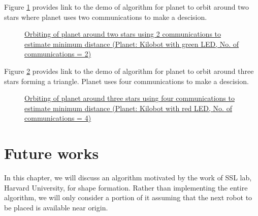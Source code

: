 \documentclass{report}[12pt]
\begin{document}
Figure \ref{fig:orbit_two_star} provides link to the demo of algorithm for planet to orbit around two stars where planet uses two communications to make a descision.
\begin{figure}[H]
    \centering
    \caption{\href{https://youtu.be/EKvty2OxXxM}{Orbiting of planet around two stars using 2 communications to estimate minimum distance (Planet: Kilobot with green LED, No. of communications = 2)}}
    \label{fig:orbit_two_star}
\end{figure}

Figure \ref{fig:orbit_three_stars} provides link to the demo of algorithm for planet to orbit around three stars forming a triangle. Planet uses four communications to make a descision.
\begin{figure}[H]
    \centering
    \caption{\href{https://youtu.be/5aZm0Os9BPc}{Orbiting of planet around three stars using four communications to estimate minimum distance (Planet: Kilobot with red LED, No. of communications = 4)}}
    \label{fig:orbit_three_stars}
\end{figure}

\chapter{Future works}
In this chapter, we will discuss an algorithm motivated by the work \cite{MR-AC-RN:2014} of SSL lab, Harvard University, for shape formation. Rather than implementing the entire algorithm, we will only consider a portion of it assuming that the next robot to be placed is available near origin.
\end{document}
